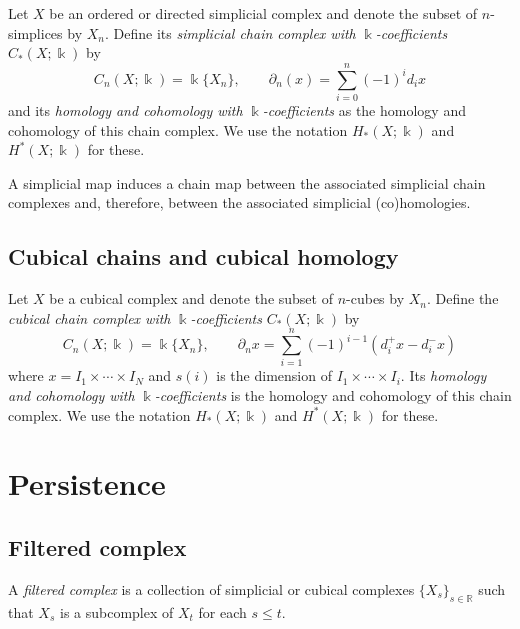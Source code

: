 \documentclass{amsart}
\begin{document}
	Let $X$ be an ordered or directed simplicial complex and denote the subset of $n$-simplices by $X_n$. Define its \textit{simplicial chain complex with} $\Bbbk$\textit{-coefficients} $C_*(X; \Bbbk)$ by
	\begin{equation*}
	C_n(X; \Bbbk) = \Bbbk\{X_n\}, \qquad \partial_n(x) = \sum_{i=0}^{n} (-1)^i d_ix
	\end{equation*}
	and its \textit{homology and cohomology with} $\Bbbk$\textit{-coefficients} as the 
	homology and cohomology of this chain complex. We use the notation $H_*(X; \Bbbk)$ and $H^*(X; \Bbbk)$ for these.
	
	A 
	simplicial map induces a 
	chain map between the associated simplicial chain complexes and, therefore, between the associated simplicial (co)homologies.
	
	\subsection*{Cubical chains and cubical homology} \label{cubical_chains_and_cubical_homology}
	
	Let $X$ be a cubical complex and denote the subset of $n$-cubes by $X_n$. Define the \textit{cubical chain complex with} $\Bbbk$\textit{-coefficients} $C_*(X; \Bbbk)$ by 
	\begin{equation*}
	C_n(X; \Bbbk) = \Bbbk\{X_n\}, \qquad \partial_n x = \sum_{i = 1}^{n} (-1)^{i-1}(d^+_i x - d^-_i x)
	\end{equation*}
	where $x = I_1 \times \cdots \times I_N$ and $s(i)$ is the dimension of $I_1 \times \cdots \times I_i$.
	Its \textit{homology and cohomology with} $\Bbbk$\textit{-coefficients} is the 
	homology and cohomology of this chain complex. We use the notation $H_*(X; \Bbbk)$ and $H^*(X; \Bbbk)$ for these.
	
	\section{Persistence}
	
	\subsection*{Filtered complex} \label{filtered_complex}
	
	A \textit{filtered complex} is a collection of simplicial or cubical complexes $\{X_s\}_{s \in \mathbb R}$ such that $X_s$ is a subcomplex of $X_t$ for each $s \leq t$.
	
\end{document}
